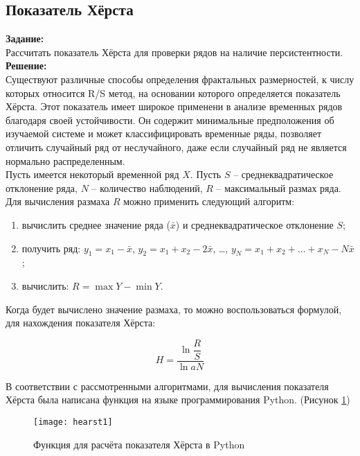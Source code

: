 \subsection*{Показатель Хёрста}

\textbf{Задание:}\\
Рассчитать показатель Хёрста для проверки рядов на наличие персистентности.\\

\textbf{Решение:}\\
Существуют различные способы определения фрактальных размерностей, к числу которых относится R/S метод, на основании которого определяется показатель Хёрста. Этот показатель имеет широкое применени в анализе временных рядов благодаря своей устойчивости. Он содержит минимальные предположения об изучаемой системе и может классифицировать временные ряды, позволяет отличить случайный ряд от неслучайного, даже если случайный ряд не является нормально распределенным.\\

Пусть имеется некоторый временной ряд $X$. Пусть $S$ -- среднеквадратическое отклонение ряда, $N$ -- количество наблюдений, $R$ -- максимальный размах ряда.\\

Для вычисления размаха $R$ можно применить следующий алгоритм:\\
\begin{enumerate}[topsep=0pt,itemsep=-1ex,partopsep=1ex,parsep=1ex]
	\item вычислить среднее значение ряда ($\bar{x}$) и среднеквадратическое отклонение $S$;
	\item получить ряд: $y_1 = x_1 - \bar{x}$, $y_2 = x_1 + x_2 - 2 \bar{x}$, \dots, $y_N = x_1 + x_2 + \dots + x_N - N \bar{x}$;
	\item вычислить: $R = \max Y - \min Y$.\\
\end{enumerate}

Когда будет вычислено значение размаха, то можно воспользоваться формулой, для нахождения показателя Хёрста:

\[ H = \dfrac{\ln \dfrac{R}{S}}{\ln a N} \]

\newpage

В соответствии с рассмотренными алгоритмами, для вычисления показателя Хёрста была написана функция на языке программирования Python. (Рисунок \ref{fig:hearst1})
\begin{figure}[h]
	\centering \texttt{[image: hearst1]}
	\caption{Функция для расчёта показателя Хёрста в Python}
	\label{fig:hearst1}
\end{figure}

